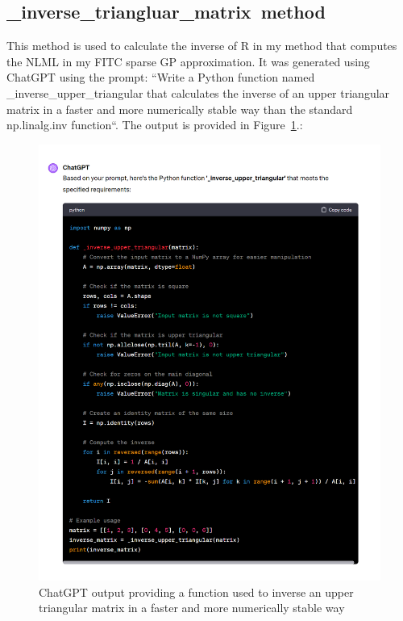 \documentclass[12pt]{article}
\begin{document}
    \subsection{\_inverse\_triangluar\_matrix\ method}
    This method is used to calculate the inverse of R in my method that computes the NLML in my FITC sparse GP approximation.
    It was generated using ChatGPT using the prompt: ``Write a Python function named \_inverse\_upper\_triangular that calculates the inverse of an upper triangular matrix in a faster and more numerically stable way than the standard np.linalg.inv function``.
    The output is provided in Figure~\ref{fig:chat-iut}.:
    \begin{figure}[htbp]
        \centering
        \includegraphics[width=1.1\linewidth]{figures/chat-iut/chat-iut.png}
        \caption{ChatGPT output providing a function used to inverse an upper triangular matrix in a faster and more numerically stable way}
        \label{fig:chat-iut}
    \end{figure}
\end{document}
